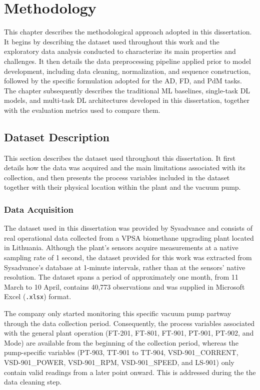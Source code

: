 
\chapter{Methodology} \label{chap:methodology}

This chapter describes the methodological approach adopted in this dissertation. It begins by describing 
the dataset used throughout this work and the exploratory data analysis conducted to characterize its 
main properties and challenges. It then details the data preprocessing pipeline applied prior to model 
development, including data cleaning, normalization, and sequence construction, followed by the specific 
formulation adopted for the AD, FD, and PdM tasks. The 
chapter subsequently describes the traditional ML baselines, single-task DL 
models, and multi-task DL architectures developed in this dissertation, together with the 
evaluation metrics used to compare them. 

\section{Dataset Description} \label{sec:dataset}

This section describes the dataset used throughout this dissertation. It first details how the data was 
acquired and the main limitations associated with its collection, and then presents the process variables 
included in the dataset together with their physical location within the plant and the vacuum pump.

\subsection{Data Acquisition} \label{sec:data_acquisition}

The dataset used in this dissertation was provided by Sysadvance and consists of real operational data 
collected from a VPSA biomethane upgrading plant located in Lithuania. Although the plant's sensors 
acquire measurements at a native sampling rate of 1 second, the dataset provided for this work was 
extracted from Sysadvance's database at 1-minute intervals, rather than at the sensors' native 
resolution. The dataset spans a period of approximately one month, from 11 March to 10 April, contains 
40{,}773 observations and was supplied in Microsoft Excel (\texttt{.xlsx}) format.

The company only started monitoring this specific vacuum pump partway through the data collection period. 
Consequently, the process variables associated with the general plant operation (FT-201, FT-801, FT-901, 
PT-901, PT-902, and Mode) are available from the beginning of the collection period, whereas the 
pump-specific variables (PT-903, TT-901 to TT-904, VSD-901\_CORRENT, VSD-901\_POWER, VSD-901\_RPM, 
VSD-901\_SPEED, and LS-901) only contain valid readings from a later point onward. This is addressed 
during the the data cleaning step.

